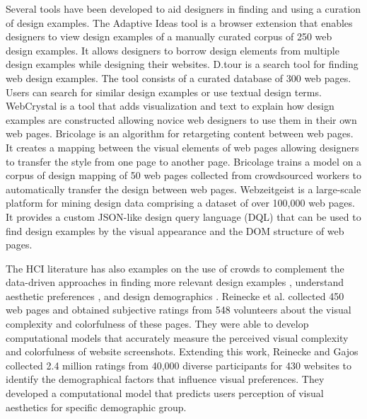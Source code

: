 Several tools have been developed to aid designers in finding and using a curation of design examples.
The Adaptive Ideas tool \cite{lee_2010_CHI} is a browser extension that enables designers to view design examples of a manually curated corpus of 250 web design examples.
It allows designers to borrow design elements from multiple design examples while designing their websites.
D.tour \cite{ritchie_2011_CHI} is a search tool for finding web design examples.
The tool consists of a curated database of 300 web pages.
Users can search for similar design examples or use textual design terms.
WebCrystal \cite{chang_2012_CHI} is a tool that adds visualization and text to explain how design examples are constructed allowing novice web designers to use them in their own web pages.
Bricolage \cite{kumar_2011_CHI} is an algorithm for retargeting content between web pages.
It creates a mapping between the visual elements of web pages allowing designers to transfer the style from one page to another page.
Bricolage trains a model on a corpus of design mapping of 50 web pages collected from crowdsourced workers to automatically transfer the design between web pages.
Webzeitgeist \cite{kumar_2013_CHI} is a large-scale platform for mining design data comprising a dataset of over 100,000 web pages.
It provides a custom JSON-like design query language (DQL) that can be used to find design examples by the visual appearance and the DOM structure of web pages.


The HCI literature has also examples on the use of crowds to complement the data-driven approaches in finding more relevant design examples \cite{kumar_2011_CHI, spirin_2014_WWW}, understand aesthetic preferences \cite{reinecke_2013_CHI}, and design demographics \cite{reinecke_2014_CHI}. 
Reinecke et al. \cite{reinecke_2013_CHI} collected 450 web pages and obtained subjective ratings from 548 volunteers about the visual complexity and colorfulness of these pages.
They were able to develop computational models that accurately measure the perceived visual complexity and colorfulness of website screenshots.
Extending this work, Reinecke and Gajos \cite{reinecke_2014_CHI} collected 2.4 million ratings from 40,000 diverse participants for 430 websites to identify the demographical factors that influence visual preferences. 
They developed a computational model that predicts users perception of visual aesthetics for specific demographic group.

